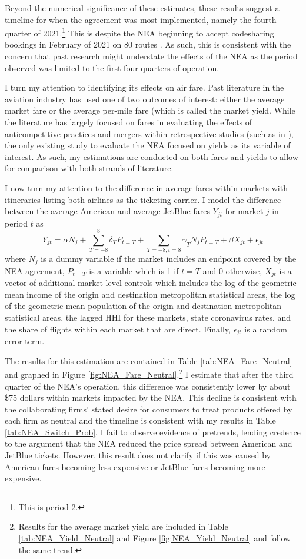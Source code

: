 \documentclass{article}
\begin{document}
	Beyond the numerical significance of these estimates, these results suggest a timeline for when the agreement was most implemented, namely the fourth quarter of 2021.\footnote{This is period 2.} This is despite the NEA beginning to accept codesharing bookings in February of 2021 on 80 routes \citep{griff_8_2021}. As such, this is consistent with the concern that past research might understate the effects of the NEA as the period observed was limited to the first four quarters of operation.
	
	 I turn my attention to identifying its effects on air fare. Past literature in the aviation industry has used one of two outcomes of interest: either the average market fare or the average per-mile fare (which is called the market yield.  While the literature has largely focused on fares in evaluating the effects of anticompetitive practices and mergers within retrospective studies (such as in \citet{luo_price_2014, carlton_are_2019}), the only existing study \citep{zou_assessing_2023} to evaluate the NEA focused on yields as its variable of interest. As such, my estimations are conducted on both fares and yields to allow for comparison with both strands of literature. 
	
	 I now turn my attention to the difference in average fares within markets with itineraries listing both airlines as the ticketing carrier.  I model the difference between the average American and average JetBlue fares $Y_{jt}$ for market $j$ in period $t$ as \[Y_{jt} = \alpha N_{j} + \sum_{T = -8}^{8} \delta_{T} P_{t = T} + \sum_{T = -8, t = 8} \gamma_{T} N_{j} P_{t = T} + \beta X_{jt} + \epsilon_{jt}\] where $N_{j}$ is a dummy variable if the market includes an endpoint covered by the NEA agreement, $P_{t = T}$ is a variable which is 1 if $t = T$ and 0 otherwise, $X_{jt}$ is a vector of additional market level controls which includes the log of the geometric mean income of the origin and destination metropolitan statistical areas, the log of the geometric mean population of the origin and destination metropolitan statistical areas, the lagged HHI for these markets, state coronavirus rates, and the share of flights within each market that are direct. Finally, $\epsilon_{jt}$ is a random error term. 
	 
	 The results for this estimation are contained in Table \ref{tab:NEA_Fare_Neutral} and graphed in Figure \ref{fig:NEA_Fare_Neutral}.\footnote{ Results for the average market yield are included in Table \ref{tab:NEA_Yield_Neutral} and Figure \ref{fig:NEA_Yield_Neutral} and follow the same trend.} I estimate that after the third quarter of the NEA's operation, this difference was consistently lower by about \$75 dollars within markets impacted by the NEA. This decline is consistent with the collaborating firms' stated desire for consumers to treat products offered by each firm as neutral and the timeline is consistent with my results in Table \ref{tab:NEA_Switch_Prob}. I fail to observe evidence of pretrends, lending credence to the argument that the NEA reduced the price spread between American and JetBlue tickets. However, this result does not clarify if this was caused by American fares becoming less expensive or JetBlue fares becoming more expensive. 
	
\end{document}
